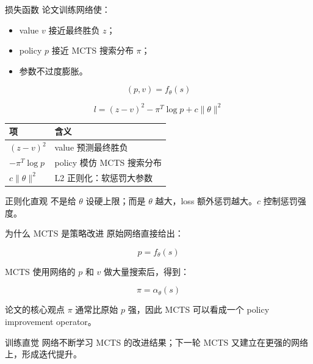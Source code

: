 \documentclass[UTF8,aspectratio=169,10pt]{ctexbeamer}
\begin{document}
\begin{frame}{损失函数}
  \small
  论文训练网络使：

  \begin{itemize}
    \item value $v$ 接近最终胜负 $z$；
    \item policy $p$ 接近 MCTS 搜索分布 $\pi$；
    \item 参数不过度膨胀。
  \end{itemize}

  \[
    (p,v)=f_{\theta}(s)
  \]

  \[
    l=(z-v)^2-\pi^T\log p+c\|\theta\|^2
  \]

  \begin{center}
    \begin{tabular}{@{}ll@{}}
      \toprule
      项 & 含义 \\
      \midrule
      $(z-v)^2$ & value 预测最终胜负 \\
      $-\pi^T\log p$ & policy 模仿 MCTS 搜索分布 \\
      $c\|\theta\|^2$ & L2 正则化：软惩罚大参数 \\
      \bottomrule
    \end{tabular}
  \end{center}

  \begin{alertblock}{正则化直观}
    不是给 $\theta$ 设硬上限；而是 $\theta$ 越大，loss 额外惩罚越大。$c$ 控制惩罚强度。
  \end{alertblock}
\end{frame}

\begin{frame}{为什么 MCTS 是策略改进}
  原始网络直接给出：

  \[
    p=f_{\theta}(s)
  \]

  MCTS 使用网络的 $p$ 和 $v$ 做大量搜索后，得到：

  \[
    \pi=\alpha_{\theta}(s)
  \]

  \begin{block}{论文的核心观点}
    $\pi$ 通常比原始 $p$ 强，因此 MCTS 可以看成一个 policy improvement operator。
  \end{block}

  \begin{alertblock}{训练直觉}
    网络不断学习 MCTS 的改进结果；下一轮 MCTS 又建立在更强的网络上，形成迭代提升。
  \end{alertblock}
\end{frame}
\end{document}
